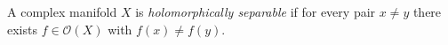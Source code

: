 
A complex manifold $X$ is \emph{holomorphically separable} if for every pair $x\ne y$ there exists $f\in\mathcal O(X)$ with $f(x)\ne f(y)$.
